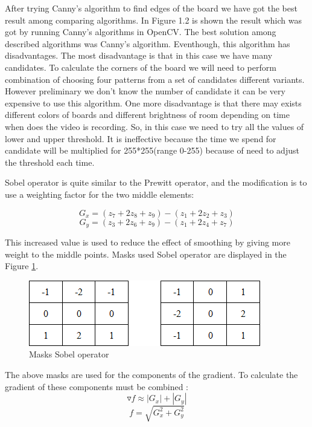 After trying Canny’s algorithm to find edges of the board we have got the best result among comparing algorithms. In Figure 1.2 is shown the result which was got by running Canny’s algorithms in OpenCV.
The best solution among described algorithms was Canny’s algorithm. Eventhough, this algorithm has disadvantages. The most disadvantage is that in this case we have many candidates. To calculate the corners of the board we will need to perform combination of choosing four patterns from a set of candidates different variants. However preliminary we don’t know the number of candidate it can be very expensive to use this algorithm. One more disadvantage is that there may exists different colors of boards and different brightness of room depending on time when does the video is recording. So, in this case we need to try all the values of lower and upper threshold. It is ineffective because the time we spend for candidate will be multiplied for 255*255(range 0-255) because of need to adjust the threshold each time.

Sobel operator is quite similar to the Prewitt operator, and the modification is to use a weighting factor for the two middle elements:

\begin{equation}
    G_x = (z_7 + 2z_8 + z_9) - (z_1 + 2z_2 + z_3)
\end{equation}
\begin{equation}
    G_y = (z_3 + 2z_6 + z_9) - (z_1 + 2z_4 + z_7)
\end{equation}

This increased value is used to reduce the effect of smoothing by giving more weight to the middle points. Masks used Sobel operator are displayed in the Figure \ref{fig:masks_sobel_operator}.

\begin{figure}[h!]
    \centering
    \includegraphics{Figures/masks_sobel_operator}
    \caption{Masks Sobel operator}
    \label{fig:masks_sobel_operator}
\end{figure}

The above masks are used for the components of the gradient. To calculate the gradient of these components must be combined \cite{Vincent}: 
\begin{equation}
    \triangledown f \approx  |G_x| + |G_y|
\end{equation}
\begin{equation}
    f = \sqrt{G_x^2 + G_y^2}
\end{equation}

